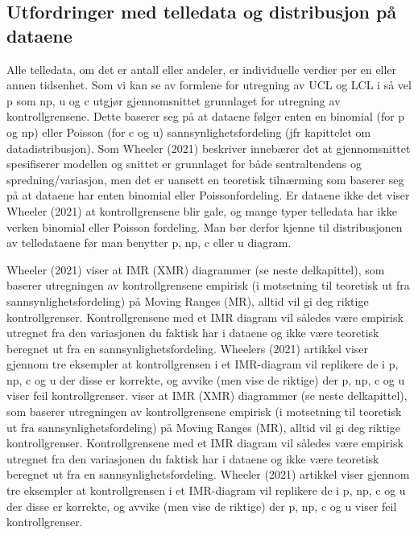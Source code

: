 \documentclass[
]{book}
\begin{document}
\hypertarget{utfordringer-med-telledata-og-distribusjon-puxe5-dataene}{%
\subsection{Utfordringer med telledata og distribusjon på dataene}\label{utfordringer-med-telledata-og-distribusjon-puxe5-dataene}}

Alle telledata, om det er antall eller andeler, er individuelle verdier per en eller annen tidsenhet. Som vi kan se av formlene for utregning av UCL og LCL i så vel p som np, u og c utgjør gjennomsnittet grunnlaget for utregning av kontrollgrensene. Dette baserer seg på at dataene følger enten en binomial (for p og np) eller Poisson (for c og u) sannsynlighetsfordeling (jfr kapittelet om datadistribusjon). Som Wheeler (2021) beskriver innebærer det at gjennomsnittet spesifiserer modellen og snittet er grunnlaget for både sentraltendens og spredning/variasjon, men det er uansett en teoretisk tilnærming som baserer seg på at dataene har enten binomial eller Poissonfordeling. Er dataene ikke det viser Wheeler (2021) at kontrollgrensene blir gale, og mange typer telledata har ikke verken binomial eller Poisson fordeling. Man bør derfor kjenne til distribusjonen av telledataene før man benytter p, np, c eller u diagram.

Wheeler (2021) viser at IMR (XMR) diagrammer (se neste delkapittel), som baserer utregningen av kontrollgrensene empirisk (i motsetning til teoretisk ut fra sannsynlighetsfordeling) på Moving Ranges (MR), alltid vil gi deg riktige kontrollgrenser. Kontrollgrensene med et IMR diagram vil således være empirisk utregnet fra den variasjonen du faktisk har i dataene og ikke være teoretisk beregnet ut fra en sannsynlighetsfordeling. Wheelers (2021) artikkel viser gjennom tre eksempler at kontrollgrensen i et IMR-diagram vil replikere de i p, np, c og u der disse er korrekte, og avvike (men vise de riktige) der p, np, c og u viser feil kontrollgrenser. viser at IMR (XMR) diagrammer (se neste delkapittel), som baserer utregningen av kontrollgrensene empirisk (i motsetning til teoretisk ut fra sannsynlighetsfordeling) på Moving Ranges (MR), alltid vil gi deg riktige kontrollgrenser. Kontrollgrensene med et IMR diagram vil således være empirisk utregnet fra den variasjonen du faktisk har i dataene og ikke være teoretisk beregnet ut fra en sannsynlighetsfordeling. Wheeler (2021) artikkel viser gjennom tre eksempler at kontrollgrensen i et IMR-diagram vil replikere de i p, np, c og u der disse er korrekte, og avvike (men vise de riktige) der p, np, c og u viser feil kontrollgrenser.
\end{document}
